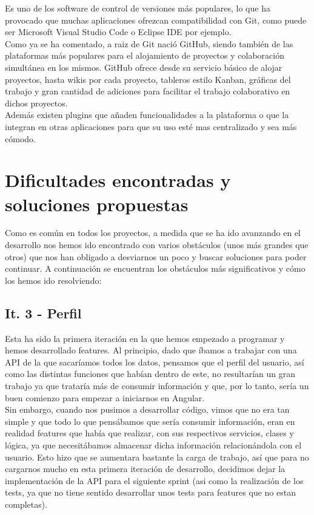 Es uno de los software de control de versiones más populares, lo que ha provocado que muchas aplicaciones ofrezcan compatibilidad con Git, como puede ser Microsoft Visual Studio Code o Eclipse IDE por ejemplo.\\

Como ya se ha comentado, a raiz de Git nació GitHub, siendo también de las plataformas más populares para el alojamiento de proyectos y colaboración simultánea en los mismos. GitHub ofrece desde su servicio básico de alojar proyectos, hasta wikis por cada proyecto, tableros estilo Kanban, gráficas del trabajo y gran cantidad de adiciones para facilitar el trabajo colaborativo en dichos proyectos.\\

Además existen plugins que añaden funcionalidades a la plataforma o que la integran en otras aplicaciones para que su uso esté mas centralizado y sea más cómodo.\\

\clearpage

\section{Dificultades encontradas y soluciones propuestas}

Como es común en todos los proyectos, a medida que se ha ido avanzando en el desarrollo nos hemos ido encontrado con varios obstáculos (unos más grandes que otros) que nos han obligado a desviarnos un poco y buscar soluciones para poder continuar. A continuación se encuentran los obstáculos más significativos y cómo los hemos ido resolviendo:

\subsection{It. 3 - Perfil}

Esta ha sido la primera iteración en la que hemos empezado a programar y hemos desarrollado features. Al principio, dado que íbamos a trabajar con una API \citep{acnhapi} de la que sacaríamos todos los datos, pensamos que el perfil del usuario, así como las distintas funciones que habían dentro de este, no resultarían un gran trabajo ya que trataría más de consumir información y que, por lo tanto, sería un buen comienzo para empezar a iniciarnos en Angular.\\

Sin embargo, cuando nos pusimos a desarrollar código, vimos que no era tan simple y que todo lo que pensábamos que sería consumir información, eran en realidad features que había que realizar, con sus respectivos servicios, clases y lógica, ya que necesitábamos almacenar dicha información relacionándola con el usuario. Esto hizo que se aumentara bastante la carga de trabajo, así que para no cargarnos mucho en esta primera iteración de desarrollo, decidimos dejar la implementación de la API para el siguiente sprint (asi como la realización de los tests, ya que no tiene sentido desarrollar unos tests para features que no estan completas).\\

